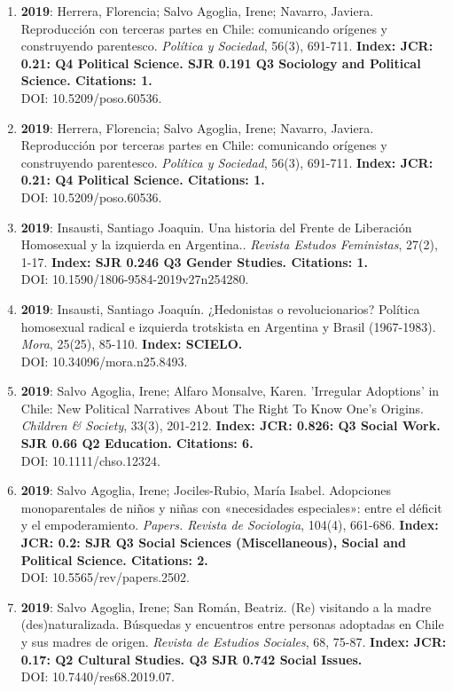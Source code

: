 \begin{enumerate}
\item {\bf 2019}: Herrera, Florencia; Salvo Agoglia, Irene; Navarro, Javiera.  Reproducción con terceras partes en Chile: comunicando orígenes y construyendo parentesco. {\it Política y Sociedad}, 56(3), 691-711. {\bf Index: JCR: 0.21: Q4 Political Science.  SJR 0.191 Q3 Sociology and Political Science. Citations: 1. } \\ DOI: 10.5209/poso.60536. \filbreak
\item {\bf 2019}: Herrera, Florencia; Salvo Agoglia, Irene; Navarro, Javiera.  Reproducción por terceras partes en Chile: comunicando orígenes y construyendo parentesco. {\it Política y Sociedad}, 56(3), 691-711. {\bf Index: JCR: 0.21: Q4 Political Science.  Citations: 1. } \\ DOI: 10.5209/poso.60536. \filbreak
\item {\bf 2019}: Insausti, Santiago Joaquin.  Una historia del Frente de Liberación Homosexual y la izquierda en Argentina.. {\it Revista Estudos Feministas}, 27(2), 1-17. {\bf Index: SJR 0.246 Q3 Gender Studies. Citations: 1. } \\ DOI: 10.1590/1806-9584-2019v27n254280. \filbreak
\item {\bf 2019}: Insausti, Santiago Joaquín.  ¿Hedonistas o revolucionarios? Política homosexual radical e izquierda trotskista en Argentina y Brasil (1967-1983). {\it Mora}, 25(25), 85-110. {\bf Index: SCIELO. } \\ DOI: 10.34096/mora.n25.8493. \filbreak
\item {\bf 2019}: Salvo Agoglia, Irene; Alfaro Monsalve, Karen.  'Irregular Adoptions' in Chile: New Political Narratives About The Right To Know One's Origins. {\it Children \& Society}, 33(3), 201-212. {\bf Index: JCR: 0.826: Q3 Social Work.  SJR 0.66 Q2 Education. Citations: 6. } \\ DOI: 10.1111/chso.12324. \filbreak
\item {\bf 2019}: Salvo Agoglia, Irene; Jociles-Rubio, María Isabel.  Adopciones monoparentales de niños y niñas con «necesidades especiales»: entre el déficit y el empoderamiento. {\it Papers. Revista de Sociologia}, 104(4), 661-686. {\bf Index: JCR: 0.2: SJR Q3 Social Sciences (Miscellaneous), Social and Political Science.  Citations: 2. } \\ DOI: 10.5565/rev/papers.2502. \filbreak
\item {\bf 2019}: Salvo Agoglia, Irene; San Román, Beatriz.  (Re) visitando a la madre (des)naturalizada. Búsquedas y encuentros entre personas adoptadas en Chile y sus madres de origen. {\it Revista de Estudios Sociales}, 68, 75-87. {\bf Index: JCR: 0.17: Q2 Cultural Studies.  Q3 SJR 0.742 Social Issues. } \\ DOI: 10.7440/res68.2019.07. \filbreak

\end{enumerate}
